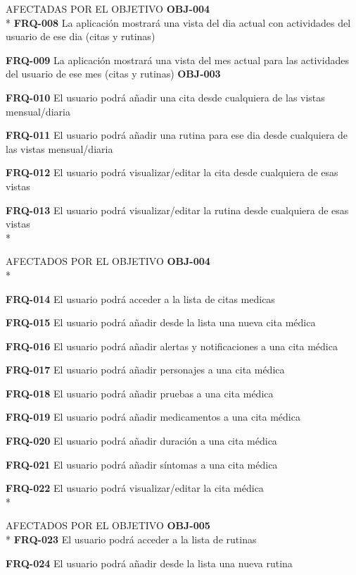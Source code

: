 \documentclass[../pfc.tex]{subfiles}
\begin{document}
	
	AFECTADAS POR EL OBJETIVO \textbf{OBJ-004}\\*
	\textbf{FRQ-008}	La aplicación mostrará una vista del dia actual con actividades del usuario de ese dia (citas y rutinas)
	
	\textbf{FRQ-009}	La aplicación mostrará una vista del mes actual para las actividades del usuario de ese mes (citas y rutinas)	\textbf{OBJ-003}
	
	\textbf{FRQ-010}	El usuario podrá añadir una cita desde cualquiera de las vistas mensual/diaria
	
	\textbf{FRQ-011}	El usuario podrá añadir una rutina para ese dia desde cualquiera de las vistas mensual/diaria
	
	\textbf{FRQ-012}	El usuario podrá visualizar/editar la cita desde cualquiera de esas vistas
	
	\textbf{FRQ-013}	El usuario podrá visualizar/editar la rutina desde cualquiera de esas vistas\\*
	
	
	AFECTADOS POR EL OBJETIVO 	\textbf{OBJ-004}\\*
	
	\textbf{FRQ-014}	El usuario podrá acceder a la lista de citas medicas
	
	\textbf{FRQ-015}	El usuario podrá añadir desde la lista una nueva cita médica
	
	\textbf{FRQ-016}	El usuario podrá añadir alertas y notificaciones a una cita médica
	
	\textbf{FRQ-017}	El usuario podrá añadir personajes a una cita médica
	
	\textbf{FRQ-018}	El usuario podrá añadir pruebas a una cita médica
	
	\textbf{FRQ-019}	El usuario podrá añadir medicamentos a una cita médica
	
	\textbf{FRQ-020}	El usuario podrá añadir duración a una cita médica
	
	\textbf{FRQ-021}	El usuario podrá añadir síntomas a una cita médica
	
	\textbf{FRQ-022}	El usuario podrá visualizar/editar la cita médica\\*
	
	
	
	AFECTADOS POR EL OBJETIVO 	\textbf{OBJ-005}\\*
	\textbf{FRQ-023}	El usuario podrá acceder a la lista de rutinas
	
	\textbf{FRQ-024}	El usuario podrá añadir desde la lista una nueva rutina
	
\end{document}
